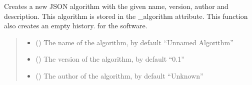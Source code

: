 \documentclass[letterpaper,10pt,english]{sphinxmanual}
\begin{document}
\begin{fulllineitems}
\begin{fulllineitems}
\label{\detokenize{source/_autosummary/HDF5_BLS_analyse.Analyse_backend:HDF5_BLS_analyse.Analyse_backend.silent_create_algorithm}}
\pysigstartsignatures
\pysiglinewithargsret
{}
{\sphinxparamcomma {}\sphinxparamcomma {}\sphinxparamcomma {}}
{}
\pysigstopsignatures
\sphinxAtStartPar
Creates a new JSON algorithm with the given name, version, author and description. This algorithm is stored in the \_algorithm attribute. This function also creates an empty history. for the software.
\begin{quote}\begin{description}
\begin{itemize}
\item {} 
\sphinxAtStartPar
{} (\sphinxstyleliteralemphasis{\sphinxupquote{, }}) \textendash{} The name of the algorithm, by default “Unnamed Algorithm”

\item {} 
\sphinxAtStartPar
{} (\sphinxstyleliteralemphasis{\sphinxupquote{, }}) \textendash{} The version of the algorithm, by default “0.1”

\item {} 
\sphinxAtStartPar
{} (\sphinxstyleliteralemphasis{\sphinxupquote{, }}) \textendash{} The author of the algorithm, by default “Unknown”


\end{itemize}
\end{description}
\end{quote}
\end{fulllineitems}
\end{fulllineitems}
\end{document}
